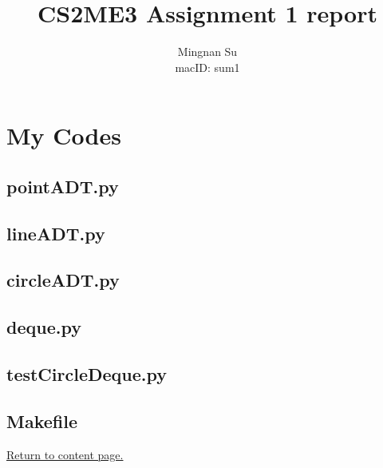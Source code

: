 \documentclass[12pt]{article}
\begin{document}
\title{CS2ME3 Assignment 1 report}
\author{Mingnan Su \\ macID: sum1}
\maketitle

\tableofcontents

\newpage
\section{My Codes}

  \subsection{pointADT.py}
  

  \subsection{lineADT.py}
  

  \subsection{circleADT.py}
  

  \subsection{deque.py}
  

  \subsection{testCircleDeque.py}
  

  \subsection{Makefile}
  


\vskip 3cm
\hyperlink{toc}{Return to content page.}
\end{document}
